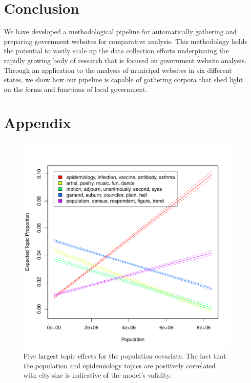 \documentclass[11pt]{article}
\begin{document}
\section{Conclusion}

We have developed a methodological pipeline for automatically gathering and preparing government websites for comparative analysis. This methodology holds the potential to vastly scale up the data collection efforts underpinning the rapidly growing body of research that is focused on government website analysis. Through an application to the analysis of municipal websites in six different states, we show how our pipeline is capable of gathering corpora that shed light on the forms and functions of local government.


%
%

\newpage

%


\newpage
\section*{Appendix}


\begin{figure}[htp]
	\centering
	\caption{Five largest topic effects for the population covariate. The fact that the population and epidemiology topics are positively correlated with city size is indicative of the model's validity.}
	\label{stmEffectPop}
	\includegraphics[width=\linewidth]{figures/stm_effect_pop.pdf}
\end{figure}
\end{document}
